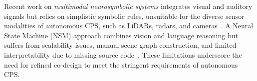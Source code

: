 Recent work on \textit{multimodal neurosymbolic systems} integrates visual and auditory signals but relies on simplistic symbolic rules, unsuitable for the diverse sensor modalities of autonomous CPS, such as LiDARs, radars, and cameras~\cite{haq_multimodal_2024}. A Neural State Machine (NSM) approach combines vision and language reasoning but suffers from scalability issues, manual scene graph construction, and limited interpretability due to missing source code~\cite{jain2024neuro}. These limitations underscore the need for refined co-design to meet the stringent requirements of autonomous CPS.

